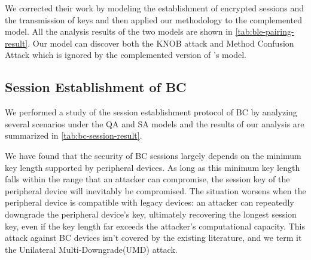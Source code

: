 \documentclass[../main.tex]{subfiles}  %
\begin{document}
We corrected their work by modeling the establishment of encrypted sessions and the transmission of keys and then applied our methodology to the complemented model. 
All the analysis results of the two models are shown in \autoref{tab:ble-pairing-result}.
Our model can discover both the  KNOB attack and Method Confusion Attack\cite{von2021method} which is ignored by the complemented version of \cite{shi2023blesc}'s model.

\subsection{Session Establishment of BC}
We performed a study of the session establishment protocol of BC by analyzing several scenarios under the QA and SA models and the results of our analysis are summarized in \autoref{tab:bc-session-result}.

We have found that the security of BC sessions largely depends on the minimum key length supported by peripheral devices. 
As long as this minimum key length falls within the range that an attacker can compromise, the session key of the peripheral device will inevitably be compromised. 
The situation worsens when the peripheral device is compatible with legacy devices: 
an attacker can repeatedly downgrade the peripheral device's key, ultimately recovering the longest session key, even if the key length far exceeds the attacker’s computational capacity.
This attack against BC devices isn't covered by the existing literature, and we term it the Unilateral Multi-Downgrade(UMD) attack.
\end{document}
